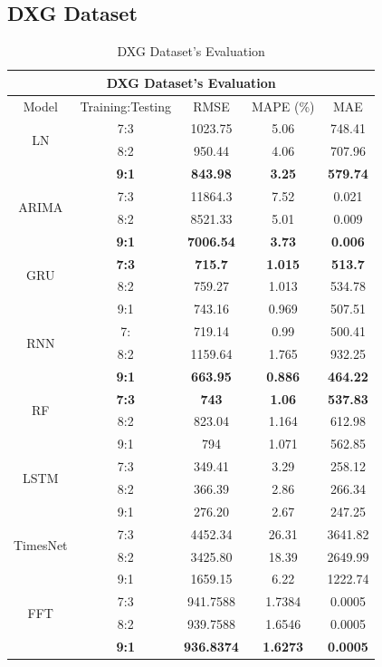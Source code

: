 \documentclass{ieeeojies}
\begin{document}
\subsection{DXG Dataset} 
\begin{table}[H]
  \centering
  \begin{tabular}{|c|c|c|c|c|}
         \hline
         \multicolumn{5}{|c|}{\textbf{DXG Dataset's Evaluation}}\\
         \hline
         \centering Model & Training:Testing & RMSE & MAPE (\%) & MAE\\
         \hline
         \multirow{2}{*}{LN} & 7:3 & 1023.75 & 5.06 & 748.41 \\ & 8:2 & 950.44 & 4.06 & 707.96 \\ & \textbf{9:1} & \textbf{843.98} & \textbf{3.25} & \textbf{579.74}\\
         \hline
         \multirow{2}{*}{ARIMA} & 7:3&11864.3&7.52&0.021\\ & 8:2&8521.33&5.01&0.009 \\ & \textbf{9:1} & \textbf{7006.54} & \textbf{3.73} & \textbf{0.006}\\
         \hline
         \multirow{2}{*}{GRU} & \textbf{7:3}& \textbf{715.7} & \textbf{1.015} & \textbf{513.7} \\ & 8:2 & 759.27 & 1.013 & 534.78  \\ & 9:1 & 743.16	&0.969&507.51\\
         \hline
         \multirow{2}{*}{RNN} & 7: &  719.14 &  0.99 &  500.41 \\ & 8:2 &  1159.64 & 1.765 &  932.25 \\ & \textbf{9:1} & \textbf{663.95} & \textbf{0.886} & \textbf{464.22} \\
         \hline
         \multirow{2}{*}{RF} & \textbf{7:3}	& \textbf{743} & \textbf{1.06} &  \textbf{537.83} \\ & 8:2 & 823.04 & 1.164 & 612.98 \\ & 9:1 & 794 & 1.071 & 562.85\\
         \hline
         \multirow{2}{*}{LSTM} & 7:3 & 349.41 & 3.29 & 258.12 \\ & 8:2 & 366.39 & 2.86 & 266.34 \\ & 9:1 & 276.20	&2.67&247.25\\
         \hline
         \multirow{2}{*}{TimesNet} & 7:3 & 4452.34 & 26.31 & 3641.82 \\ & 8:2 & 3425.80 & 18.39 & 2649.99 \\ & 9:1 & 1659.15	& 6.22 &1222.74\\
         \hline
         \multirow{2}{*}{FFT} & 7:3 & 941.7588 &  1.7384 &  0.0005 \\ & 8:2 & 939.7588 &  1.6546 &  0.0005 \\ & \textbf{9:1} & \textbf{936.8374} & \textbf{1.6273} & \textbf{0.0005}\\
         \hline
    \end{tabular}
    \caption{DXG Dataset's Evaluation}

    \label{vcbresult}
\end{table}
\end{document}
